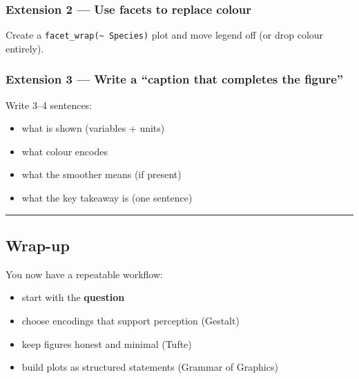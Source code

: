 \documentclass[
  letterpaper,
  DIV=11,
  numbers=noendperiod]{scrartcl}
\providecommand{\tightlist}{%
  \setlength{\itemsep}{0pt}\setlength{\parskip}{0pt}}\usepackage{longtable,booktabs,array}
\begin{document}
\subsubsection{Extension 2 --- Use facets to replace
colour}\label{extension-2-use-facets-to-replace-colour}

Create a \texttt{facet\_wrap(\textasciitilde{}\ Species)} plot and move
legend off (or drop colour entirely).

\subsubsection{Extension 3 --- Write a ``caption that completes the
figure''}\label{extension-3-write-a-caption-that-completes-the-figure}

Write 3--4 sentences:

\begin{itemize}
\tightlist
\item
  what is shown (variables + units)
\item
  what colour encodes
\item
  what the smoother means (if present)
\item
  what the key takeaway is (one sentence)
\end{itemize}

\begin{center}\rule{0.5\linewidth}{0.5pt}\end{center}

\subsection{Wrap-up}\label{wrap-up}

You now have a repeatable workflow:

\begin{itemize}
\tightlist
\item
  start with the \textbf{question}
\item
  choose encodings that support perception (Gestalt)
\item
  keep figures honest and minimal (Tufte)
\item
  build plots as structured statements (Grammar of Graphics)
\end{itemize}
\end{document}
